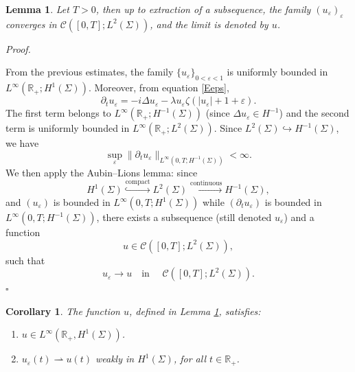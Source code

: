 \documentclass[10pt]{article}
\newtheorem{lemma}[theorem]{Lemma}
\newtheorem{corollary}[theorem]{Corollary}
\renewenvironment{proof}[1][Proof]{%
  \noindent\textit{#1. }%
}{\hfill$\square$\vspace{4pt}}
\begin{document}
\begin{lemma}\label{ona}
Let $T>0$, then up to extraction of a subsequence, the family $(u_\varepsilon)_\varepsilon$ converges in $\mathcal{C}([0,T]; L^2(\Sigma))$, and the limit is denoted by $u$.
\end{lemma}

\begin{proof}
From the previous estimates, the family $\{ u_\varepsilon \}_{0<\varepsilon<1}$ is uniformly bounded in $L^\infty(\mathbb{R}_+; H^1(\Sigma))$. Moreover, from equation \eqref{Eeps},
\[
\partial_t u_\varepsilon = -i \Delta u_\varepsilon - \lambda u_\varepsilon \zeta(|u_\varepsilon|+1+\varepsilon).
\]
The first term belongs to $L^\infty(\mathbb{R}_+; H^{-1}(\Sigma))$ (since $\Delta u_\varepsilon \in H^{-1}$) and the second term is uniformly bounded in $L^\infty(\mathbb{R}_+; L^2(\Sigma))$. Since $L^2(\Sigma) \hookrightarrow H^{-1}(\Sigma)$, we have
\[
\sup_\varepsilon \|\partial_t u_\varepsilon\|_{L^\infty(0,T; H^{-1}(\Sigma))} < \infty.
\]
We then apply the Aubin–Lions lemma: since
\[
H^1(\Sigma) \overset{\text{compact}}{\hookrightarrow} L^2(\Sigma) \overset{\text{continuous}}{\hookrightarrow} H^{-1}(\Sigma),
\]
and $(u_\varepsilon)$ is bounded in $L^\infty(0,T; H^1(\Sigma))$ while $(\partial_t u_\varepsilon)$ is bounded in $L^\infty(0,T; H^{-1}(\Sigma))$, there exists a subsequence (still denoted $u_\varepsilon$) and a function
\[
u \in \mathcal{C}([0,T]; L^2(\Sigma)),
\]
such that
\[
u_\varepsilon \to u \quad \text{in }\quad \mathcal{C}([0,T]; L^2(\Sigma)).
\]
\end{proof}

\begin{corollary}\label{cv}
The function $u$, defined in Lemma \ref{ona}, satisfies:
\begin{enumerate}
    \item $u \in L^{\infty}(\mathbb{R}_+, H^1(\Sigma))$.
    \item $u_\varepsilon(t) \rightharpoonup u(t)$ weakly in $H^1(\Sigma)$, for all $t \in \mathbb{R}_+$.
\end{enumerate}
\end{corollary}

    
\end{document}
